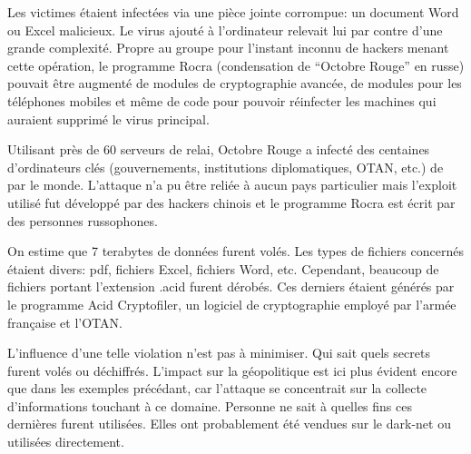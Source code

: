 \documentclass[article, french]{yReport}
\begin{document}
	Les victimes étaient infectées via une pièce jointe corrompue: un document Word ou Excel malicieux.
	Le virus ajouté à l'ordinateur relevait lui par contre d'une grande complexité.
	Propre au groupe pour l'instant inconnu de hackers menant cette opération, le programme Rocra  (condensation de \enquote{Octobre Rouge} en russe) pouvait être augmenté de modules de cryptographie avancée, de modules pour les téléphones mobiles et même de code pour pouvoir réinfecter les machines qui auraient supprimé le virus principal.
	
	Utilisant près de 60 serveurs de relai, Octobre Rouge a infecté des centaines d'ordinateurs clés (gouvernements, institutions diplomatiques, OTAN, etc.) de par le monde.
	L'attaque n'a pu être reliée à aucun pays particulier mais l'exploit utilisé fut développé par des hackers chinois et le programme Rocra est écrit par des personnes russophones.
	
	On estime que 7 terabytes de données furent volés.
	Les types de fichiers concernés étaient divers: pdf, fichiers Excel, fichiers Word, etc.
	Cependant, beaucoup de fichiers portant l'extension .acid furent dérobés.
	Ces derniers étaient générés par le programme Acid Cryptofiler, un logiciel de cryptographie employé par l'armée française et l'OTAN.
	
	L'influence d'une telle violation n'est pas à minimiser.
	Qui sait quels secrets furent volés ou déchiffrés.
	L'impact sur la géopolitique est ici plus évident encore que dans les exemples précédant, car l'attaque se concentrait sur la collecte d'informations touchant à ce domaine.
	Personne ne sait à quelles fins ces dernières furent utilisées.
	Elles ont probablement été vendues sur le dark-net ou utilisées directement.
	
	\vfill
	\hfill{}
	
\end{document}
